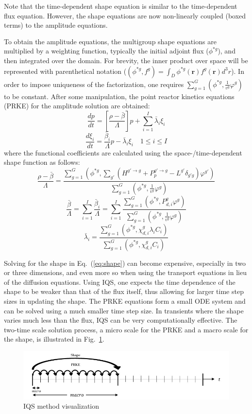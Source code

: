 \documentclass{anstrans}
\renewcommand{\vec}[1]{\bm{#1}} %
\newcommand{\eqt}[1]{Eq.~(\ref{#1})}                     %
\newcommand{\fig}[1]{Fig.~\ref{#1}}                      %
\newcommand{\be}{\begin{equation}}
\newcommand{\ee}{\end{equation}}
\begin{document}
Note that the time-dependent shape equation is similar to the time-dependent flux equation. 
However, the shape equations are now non-linearly coupled (boxed terms) to the amplitude equations.

To obtain the amplitude equations, the multigroup shape equations are multiplied by a weighting function, typically the initial adjoint flux ($\phi^{*g}$), and then integrated over the domain.  For brevity, the inner product over space will be represented with parenthetical notation ($\left(\phi^{*g},f^g\right) = \int_D \phi^{*g}(\vec{r})f^g(\vec{r})d^3r
$). In order to impose uniqueness of the factorization, one requires $\sum_{g=1}^G\left(\phi^{*g},\frac{1}{v^g}\varphi^g\right)$ to be constant.  After some manipulation, the point reactor kinetics equations (PRKE) for the amplitude solution are obtained:
\be
\frac{dp}{dt}=\left[\frac{\rho-\bar{\beta}}{\Lambda}\right]p+\sum_{i=1}^I\bar{\lambda}_i\xi_i
\ee
\be
\frac{d\xi_i}{dt}=\frac{\bar{\beta}_i}{\Lambda}p-\bar{\lambda}_i\xi_i \quad 1 \le i \le I 
\ee
where the functional coefficients are calculated using the space-/time-dependent shape function as follows:
\be
\frac{\rho-\bar{\beta}}{\Lambda}=\frac{ \sum_{g=1}^G\left(\phi^{*g},\sum_{g'}(H^{g' \to g}+P_p^{g' \to g}-L^{g'}\delta_{g'g})\varphi^{g'}\right)}{\sum_{g=1}^G\left(\phi^{*g},\frac{1}{v^g}\varphi^g\right)}
\label{eq:rmb}
\ee
\be
\frac{\bar{\beta}}{\Lambda}=\sum_{i=1}^I\frac{\bar{\beta}_i}{\Lambda}=\sum_{i=1}^I\frac{\sum_{g=1}^G(\phi^{*g}, P_{d,i}^g \varphi^g)}{\sum_{g=1}^G\left(\phi^{*g},\frac{1}{v^g}\varphi^g\right)}
\ee
\be
\bar{\lambda}_i=\frac{\sum_{g=1}^G(\phi^{*g},\chi_{d,i}^g\lambda_i C_i)}{\sum_{g=1}^G(\phi^{*g},\chi_{d,i}^gC_i)}
\label{eq:l}
\ee

Solving for the shape in \eqt{eq:shape} can become expensive, especially in two or three dimensions, and even more so when using the transport equations in lieu of the diffusion equations.  Using IQS, one expects the time dependence of the shape to be weaker than that of the flux itself, thus allowing for larger time step sizes in updating the shape. The PRKE equations form a small ODE system and can be solved using a much smaller time step size. In transients where the shape varies much less than the flux, IQS can be very computationally effective. The two-time scale solution process, a micro scale for the PRKE and a macro scale for the shape, is illustrated in \fig{fig:iqsviz}.  

\begin{figure}[!htbp]
\centering
\includegraphics[width=\linewidth]{IQS_visualization.jpg}
\caption{IQS method visualization}
\label{fig:iqsviz}
\end{figure}
\end{document}
